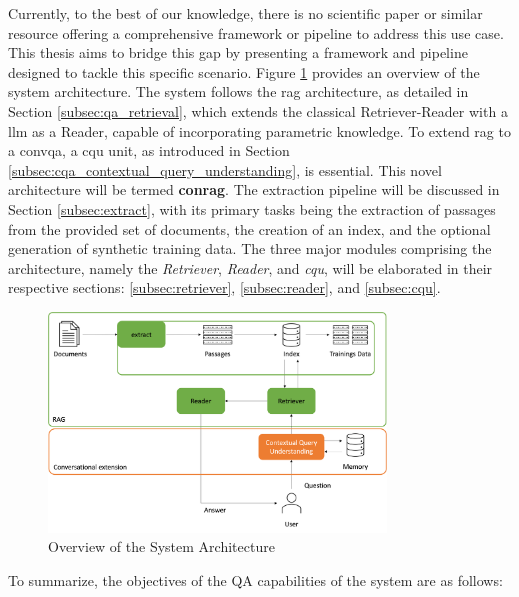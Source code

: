 Currently, to the best of our knowledge, there is no scientific paper or similar resource offering a comprehensive framework or pipeline to address this use case. This thesis aims to bridge this gap by presenting a framework and pipeline designed to tackle this specific scenario. Figure \ref{fig:overview-system-architecture} provides an overview of the system architecture. The system follows the \gls{rag} architecture, as detailed in Section \ref{subsec:qa_retrieval}, which extends the classical Retriever-Reader with a \gls{llm} as a Reader, capable of incorporating parametric knowledge. To extend \gls{rag} to a \gls{convqa}, a \gls{cqu} unit, as introduced in Section \ref{subsec:cqa_contextual_query_understanding}, is essential. This novel architecture will be termed \textbf{\gls{conrag}}. The extraction pipeline will be discussed in Section \ref{subsec:extract}, with its primary tasks being the extraction of passages from the provided set of documents, the creation of an index, and the optional generation of synthetic training data. The three major modules comprising the architecture, namely the \textit{Retriever}, \textit{Reader}, and \textit{\gls{cqu}}, will be elaborated in their respective sections: \ref{subsec:retriever}, \ref{subsec:reader}, and \ref{subsec:cqu}.

\begin{figure}
    \centering
    \includegraphics[width=0.8\textwidth]{Grafiken/System_Architecture.png}
    \caption{Overview of the System Architecture}
    \label{fig:overview-system-architecture}
\end{figure}

To summarize, the objectives of the QA capabilities of the system are as follows:

